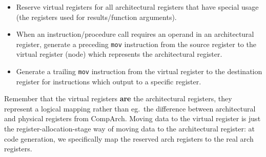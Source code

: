 \documentclass[a4paper, 11pt]{article}
\begin{document}
{{{            \begin{itemize}
            \item Reserve virtual registers for all architectural registers that have special usage (the registers used for results/function arguments).
            \item When an instruction/procedure call requires an operand in an architectural register, generate a preceding \texttt{mov} instruction from the source register to the virtual register (node) which represents the architectural register.
            \item Generate a trailing \texttt{mov} instruction from the virtual register to the destination register for instructions which output to a specific register.
            \end{itemize}

            Remember that the virtual registers \textbf{are} the architectural registers, they represent a logical mapping rather than eg.\ the difference between architectural and physical registers from CompArch. Moving data to the virtual register is just the register-allocation-stage way of moving data to the architectural register: at code generation, we specifically map the reserved arch registers to the real arch registers.
        }
    }
}
\end{document}
